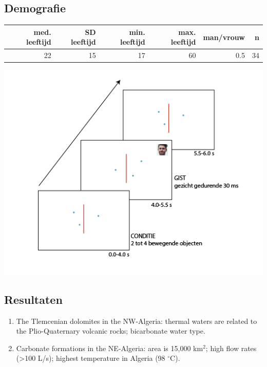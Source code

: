 \documentclass[a1,portrait]{a0poster}
\begin{document}
\begin{multicols}{3}
\subsection*{Demografie}
\begin{tabular}{r r r r r r}
	\hline
	med. leeftijd & SD leeftijd & min. leeftijd & max. leeftijd & man/vrouw & n\\
	\hline
	22 & 15 & 17 & 60 & 0.5 & 34\\
	\hline
\end{tabular}
\begin{center}\vspace{1cm}
\includegraphics[width=1.0\linewidth]{Methode.png}
\end{center}\vspace{1cm}


\subsection*{Resultaten}
\begin{enumerate}
\item The Tlemcenian dolomites in the NW-Algeria: thermal waters are related to the Plio-Quaternary volcanic rocks; bicarbonate water type.
\item Carbonate formations in the NE-Algeria: area is 15,000 km$^2$; high flow rates (\textgreater100 L/s); highest temperature in Algeria (98 $^{\circ}$C). 
\end{enumerate}


\end{multicols}
\end{document}
